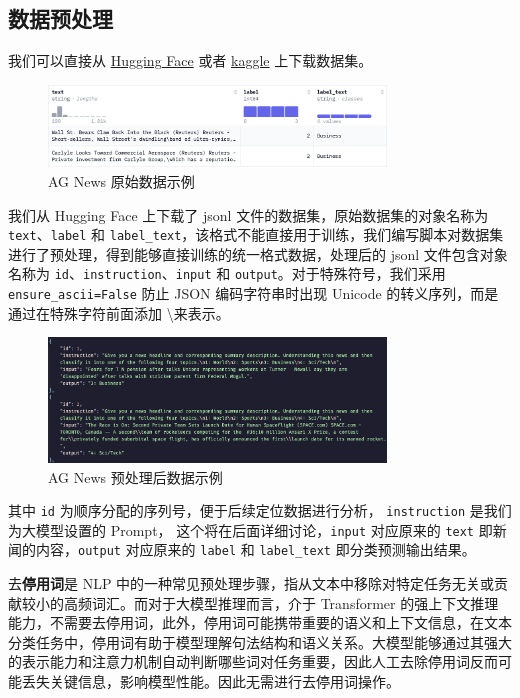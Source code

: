 \subsection{数据预处理}

我们可以直接从 \href{https://huggingface.co/datasets/SetFit/ag_news}{Hugging Face} 或者 \href{https://www.kaggle.com/datasets/amananandrai/ag-news-classification-dataset}{kaggle} 上下载数据集。

\begin{figure}[htbp]
    \centering
    \includegraphics[width=0.8\textwidth]{images/orgin_title.png}
    \caption{AG News 原始数据示例}
\end{figure}

我们从 Hugging Face 上下载了 jsonl 文件的数据集，原始数据集的对象名称为\texttt{text}、\texttt{label} 和 \texttt{label\_text}，该格式不能直接用于训练，我们编写脚本对数据集进行了预处理，得到能够直接训练的统一格式数据，处理后的 jsonl 文件包含对象名称为 \texttt{id}、\texttt{instruction}、\texttt{input} 和 \texttt{output}。对于特殊符号，我们采用 \texttt{ensure\_ascii=False} 防止 JSON 编码字符串时出现 Unicode 的转义序列，而是通过在特殊字符前面添加 \textbackslash 来表示。

\begin{figure}[htbp]
    \centering
    \includegraphics[width=0.8\textwidth]{images/preprocessed_title.png}
    \caption{AG News 预处理后数据示例}
\end{figure}

其中 \texttt{id} 为顺序分配的序列号，便于后续定位数据进行分析， \texttt{instruction} 是我们为大模型设置的 Prompt， 这个将在后面详细讨论，\texttt{input} 对应原来的 \texttt{text} 即新闻的内容，\texttt{output} 对应原来的 \texttt{label} 和 \texttt{label\_text} 即分类预测输出结果。 

去\textbf{停用词}是 NLP 中的一种常见预处理步骤，指从文本中移除对特定任务无关或贡献较小的高频词汇。而对于大模型推理而言，介于 Transformer 的强上下文推理能力，不需要去停用词，此外，停用词可能携带重要的语义和上下文信息，在文本分类任务中，停用词有助于模型理解句法结构和语义关系。大模型能够通过其强大的表示能力和注意力机制自动判断哪些词对任务重要，因此人工去除停用词反而可能丢失关键信息，影响模型性能。因此无需进行去停用词操作。

